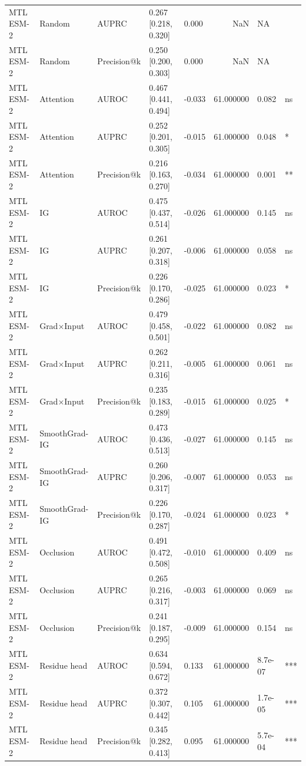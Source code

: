 \begin{tabular}{lllllrll}
MTL ESM-2 & Random & AUPRC & 0.267 [0.218, 0.320] & 0.000 & NaN & NA &  \\
MTL ESM-2 & Random & Precision@k & 0.250 [0.200, 0.303] & 0.000 & NaN & NA &  \\
MTL ESM-2 & Attention & AUROC & 0.467 [0.441, 0.494] & -0.033 & 61.000000 & 0.082 & ns \\
MTL ESM-2 & Attention & AUPRC & 0.252 [0.201, 0.305] & -0.015 & 61.000000 & 0.048 & * \\
MTL ESM-2 & Attention & Precision@k & 0.216 [0.163, 0.270] & -0.034 & 61.000000 & 0.001 & ** \\
MTL ESM-2 & IG & AUROC & 0.475 [0.437, 0.514] & -0.026 & 61.000000 & 0.145 & ns \\
MTL ESM-2 & IG & AUPRC & 0.261 [0.207, 0.318] & -0.006 & 61.000000 & 0.058 & ns \\
MTL ESM-2 & IG & Precision@k & 0.226 [0.170, 0.286] & -0.025 & 61.000000 & 0.023 & * \\
MTL ESM-2 & Grad×Input & AUROC & 0.479 [0.458, 0.501] & -0.022 & 61.000000 & 0.082 & ns \\
MTL ESM-2 & Grad×Input & AUPRC & 0.262 [0.211, 0.316] & -0.005 & 61.000000 & 0.061 & ns \\
MTL ESM-2 & Grad×Input & Precision@k & 0.235 [0.183, 0.289] & -0.015 & 61.000000 & 0.025 & * \\
MTL ESM-2 & SmoothGrad-IG & AUROC & 0.473 [0.436, 0.513] & -0.027 & 61.000000 & 0.145 & ns \\
MTL ESM-2 & SmoothGrad-IG & AUPRC & 0.260 [0.206, 0.317] & -0.007 & 61.000000 & 0.053 & ns \\
MTL ESM-2 & SmoothGrad-IG & Precision@k & 0.226 [0.170, 0.287] & -0.024 & 61.000000 & 0.023 & * \\
MTL ESM-2 & Occlusion & AUROC & 0.491 [0.472, 0.508] & -0.010 & 61.000000 & 0.409 & ns \\
MTL ESM-2 & Occlusion & AUPRC & 0.265 [0.216, 0.317] & -0.003 & 61.000000 & 0.069 & ns \\
MTL ESM-2 & Occlusion & Precision@k & 0.241 [0.187, 0.295] & -0.009 & 61.000000 & 0.154 & ns \\
MTL ESM-2 & Residue head & AUROC & 0.634 [0.594, 0.672] & 0.133 & 61.000000 & 8.7e-07 & *** \\
MTL ESM-2 & Residue head & AUPRC & 0.372 [0.307, 0.442] & 0.105 & 61.000000 & 1.7e-05 & *** \\
MTL ESM-2 & Residue head & Precision@k & 0.345 [0.282, 0.413] & 0.095 & 61.000000 & 5.7e-04 & *** \\

\end{tabular}
